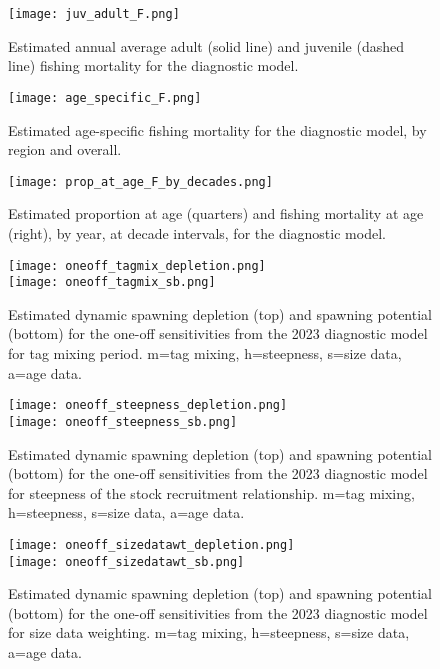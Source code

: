 \newpage
\begin{figure}[!ht]
  \centering
  \texttt{[image: juv\_adult\_F.png]}
  \caption{Estimated annual average adult (solid line) and juvenile (dashed line) fishing mortality for the diagnostic model.\label{fig:juv_adult_F}}
\end{figure}
\clearpage

\newpage
\begin{figure}[!ht]
  \centering
  \texttt{[image: age\_specific\_F.png]}
  \caption{Estimated age-specific fishing mortality for the diagnostic model, by region and overall.\label{fig:age_specific_F}}
\end{figure}
\clearpage

\newpage
\begin{figure}[!ht]
  \centering
  \texttt{[image: prop\_at\_age\_F\_by\_decades.png]}
  \caption{Estimated proportion at age (quarters) and fishing mortality at age (right), by year, at decade intervals, for the diagnostic model.\label{fig:prop_at_age_F_by_decades}}
\end{figure}
\clearpage

\newpage
\begin{figure}[!ht]
  \centering
  \texttt{[image: oneoff\_tagmix\_depletion.png]}\\[4mm]
  \texttt{[image: oneoff\_tagmix\_sb.png]}
  \caption{Estimated dynamic spawning depletion (top) and spawning potential (bottom) for the one-off sensitivities from the 2023 diagnostic model for tag mixing period. m=tag mixing, h=steepness, s=size data, a=age data.\label{fig:one_off_sens_tagmix}}
\end{figure}
\clearpage

\newpage
\begin{figure}[!ht]
  \centering
  \texttt{[image: oneoff\_steepness\_depletion.png]}\\[4mm]
  \texttt{[image: oneoff\_steepness\_sb.png]}
  \caption{Estimated dynamic spawning depletion (top) and spawning potential (bottom) for the one-off sensitivities from the 2023 diagnostic model for steepness of the stock recruitment relationship. m=tag mixing, h=steepness, s=size data, a=age data.\label{fig:one_off_sens_steepness}}
\end{figure}
\clearpage

\newpage
\begin{figure}[!ht]
  \centering
  \texttt{[image: oneoff\_sizedatawt\_depletion.png]}\\[4mm]
  \texttt{[image: oneoff\_sizedatawt\_sb.png]}
  \caption{Estimated dynamic spawning depletion (top) and spawning potential (bottom) for the one-off sensitivities from the 2023 diagnostic model for size data weighting. m=tag mixing, h=steepness, s=size data, a=age data.\label{fig:one_off_sens_sizedatawt}}
\end{figure}
\clearpage

